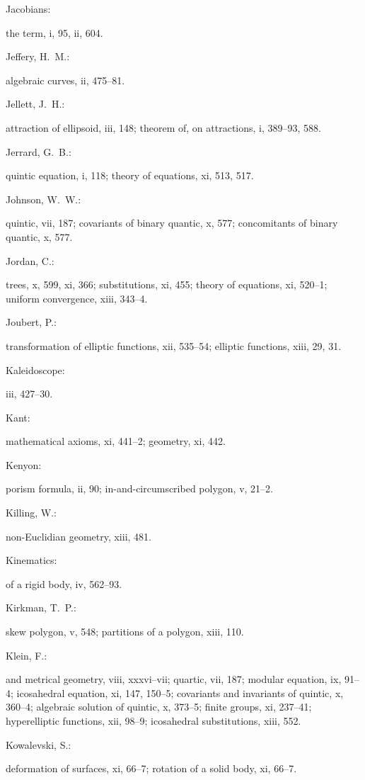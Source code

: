 \documentclass[11pt,a4paper]{book}
\providecommand{\V}[1]{#1}
\providecommand{\IndexEntry}[2]{#1\dotfill #2\par}
\begin{document}
\IndexEntry{Jacobians}: the term, \V{i}, 95, \V{ii}, 604.

\IndexEntry{Jeffery, H.\ M.}: algebraic curves, \V{ii}, 475--81.

\IndexEntry{Jellett, J.\ H.}: attraction of ellipsoid, \V{iii}, 148; theorem of, on attractions, \V{i}, 389--93, 588.

\IndexEntry{Jerrard, G.\ B.}: quintic equation, \V{i}, 118; theory of equations, \V{xi}, 513, 517.

\IndexEntry{Johnson, W.\ W.}: quintic, \V{vii}, 187; covariants of binary quantic, \V{x}, 577; concomitants of binary quantic, \V{x}, 577.

\IndexEntry{Jordan, C.}: trees, \V{x}, 599, \V{xi}, 366; substitutions, \V{xi}, 455; theory of equations, \V{xi}, 520--1; uniform convergence, \V{xiii}, 343--4.

\IndexEntry{Joubert, P.}: transformation of elliptic functions, \V{xii}, 535--54; elliptic functions, \V{xiii}, 29, 31.

\newpage

\setcounter{page}{107}

\IndexEntry{Kaleidoscope}: \V{iii}, 427--30.

\IndexEntry{Kant}: mathematical axioms, \V{xi}, 441--2; geometry, \V{xi}, 442.

\IndexEntry{Kenyon}: porism formula, \V{ii}, 90; in-and-circumscribed polygon, \V{v}, 21--2.

\IndexEntry{Killing, W.}: non-Euclidian geometry, \V{xiii}, 481.

\IndexEntry{Kinematics}: of a rigid body, \V{iv}, 562--93.

\IndexEntry{Kirkman, T.\ P.}: skew polygon, \V{v}, 548; partitions of a polygon, \V{xiii}, 110.

\IndexEntry{Klein, F.}: and metrical geometry, \V{viii}, xxxvi--vii; quartic, \V{vii}, 187; modular equation, \V{ix}, 91--4; icosahedral equation, \V{xi}, 147, 150--5; covariants and invariants of quintic, \V{x}, 360--4; algebraic solution of quintic, \V{x}, 373--5; finite groups, \V{xi}, 237--41; hyperelliptic functions, \V{xii}, 98--9; icosahedral substitutions, \V{xiii}, 552.

\IndexEntry{Kowalevski, S.}: deformation of surfaces, \V{xi}, 66--7; rotation of a solid body, \V{xi}, 66--7.
\end{document}
